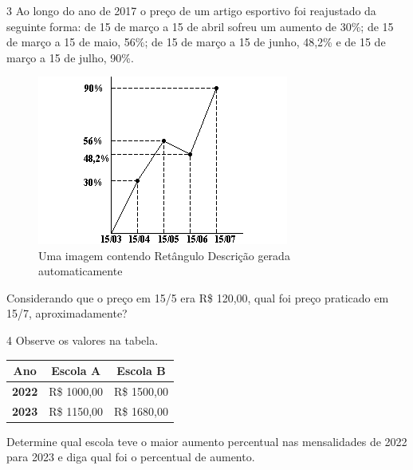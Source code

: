 {{\num{3} Ao longo do ano de 2017 o preço de um artigo esportivo foi
reajustado da seguinte forma: de 15 de março a 15 de abril sofreu um
aumento de 30\%; de 15 de março a 15 de maio, 56\%; de 15 de março a 15
de junho, 48,2\% e de 15 de março a 15 de julho, 90\%.

\begin{figure}
\centering
\includegraphics[width=3.25in,height=2.18333in]{./_SAEB_9_MAT/media/image58.png}
\caption{Uma imagem contendo Retângulo Descrição gerada automaticamente}
\end{figure}

Considerando que o preço em 15/5 era R\$ 120,00, qual foi preço praticado
em 15/7, aproximadamente?


\num{4} Observe os valores na tabela. 

\begin{table}[]
\begin{tabular}{|lll|}
\hline
\multicolumn{1}{|c}{\textbf{Ano}} & \multicolumn{1}{c}{\textbf{Escola A}} & \multicolumn{1}{c|}{\textbf{Escola B}} \\ \hline
\textbf{2022} & R\$ 1000,00 & R\$ 1500,00 \\ \hline
\textbf{2023} & R\$ 1150,00 & R\$ 1680,00 \\ \hline
\end{tabular}
\end{table}

Determine qual escola teve o maior aumento percentual nas mensalidades
de 2022 para 2023 e diga qual foi o percentual de aumento.

}}

